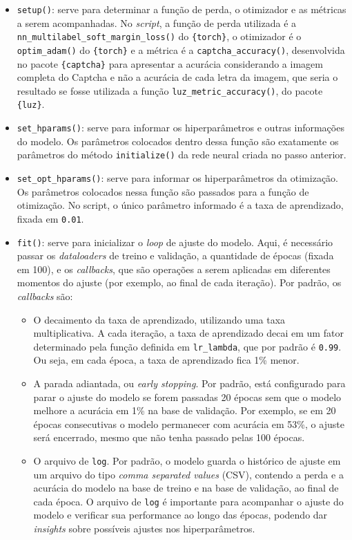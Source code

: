 \documentclass[12pt,twoside,brazilian]{book}
\providecommand{\tightlist}{%
  \setlength{\itemsep}{0pt}\setlength{\parskip}{0pt}}
\begin{document}
\begin{itemize}
\tightlist
\item
  \texttt{setup()}: serve para determinar a função de perda, o
  otimizador e as métricas a serem acompanhadas. No \emph{script}, a
  função de perda utilizada é a
  \texttt{nn\_multilabel\_soft\_margin\_loss()} do \texttt{\{torch\}}, o
  otimizador é o \texttt{optim\_adam()} do \texttt{\{torch\}} e a
  métrica é a \texttt{captcha\_accuracy()}, desenvolvida no pacote
  \texttt{\{captcha\}} para apresentar a acurácia considerando a imagem
  completa do Captcha e não a acurácia de cada letra da imagem, que
  seria o resultado se fosse utilizada a função
  \texttt{luz\_metric\_accuracy()}, do pacote \texttt{\{luz\}}.
\item
  \texttt{set\_hparams()}: serve para informar os hiperparâmetros e
  outras informações do modelo. Os parâmetros colocados dentro dessa
  função são exatamente os parâmetros do método \texttt{initialize()} da
  rede neural criada no passo anterior.
\item
  \texttt{set\_opt\_hparams()}: serve para informar os hiperparâmetros
  da otimização. Os parâmetros colocados nessa função são passados para
  a função de otimização. No script, o único parâmetro informado é a
  taxa de aprendizado, fixada em \texttt{0.01}.
\item
  \texttt{fit()}: serve para inicializar o \emph{loop} de ajuste do
  modelo. Aqui, é necessário passar os \emph{dataloaders} de treino e
  validação, a quantidade de épocas (fixada em 100), e os
  \emph{callbacks}, que são operações a serem aplicadas em diferentes
  momentos do ajuste (por exemplo, ao final de cada iteração). Por
  padrão, os \emph{callbacks} são:

  \begin{itemize}
  \tightlist
  \item
    O decaimento da taxa de aprendizado, utilizando uma taxa
    multiplicativa. A cada iteração, a taxa de aprendizado decai em um
    fator determinado pela função definida em \texttt{lr\_lambda}, que
    por padrão é \texttt{0.99}. Ou seja, em cada época, a taxa de
    aprendizado fica 1\% menor.
  \item
    A parada adiantada, ou \emph{early stopping}. Por padrão, está
    configurado para parar o ajuste do modelo se forem passadas 20
    épocas sem que o modelo melhore a acurácia em 1\% na base de
    validação. Por exemplo, se em 20 épocas consecutivas o modelo
    permanecer com acurácia em 53\%, o ajuste será encerrado, mesmo que
    não tenha passado pelas 100 épocas.
  \item
    O arquivo de \texttt{log}. Por padrão, o modelo guarda o histórico
    de ajuste em um arquivo do tipo \emph{comma separated values} (CSV),
    contendo a perda e a acurácia do modelo na base de treino e na base
    de validação, ao final de cada época. O arquivo de \texttt{log} é
    importante para acompanhar o ajuste do modelo e verificar sua
    performance ao longo das épocas, podendo dar \emph{insights} sobre
    possíveis ajustes nos hiperparâmetros.
  \end{itemize}
\end{itemize}
\end{document}
